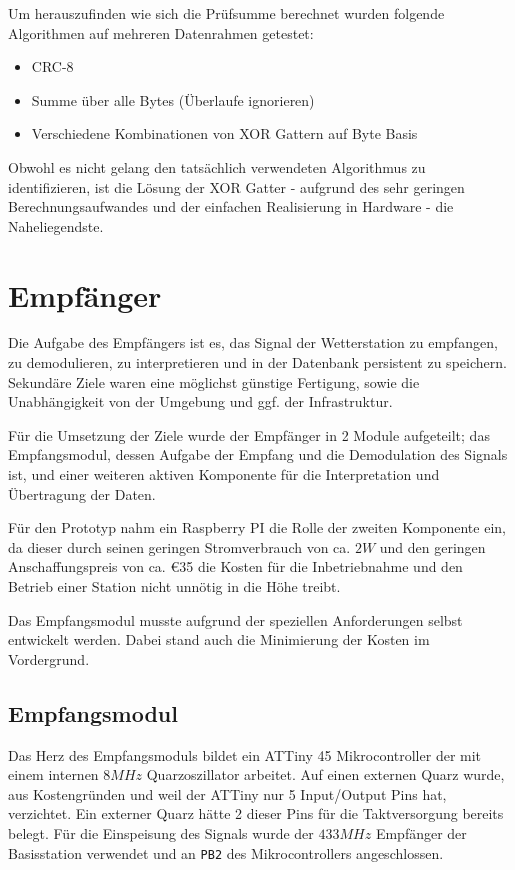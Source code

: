 \documentclass{report}
\begin{document}
Um herauszufinden wie sich die Prüfsumme berechnet wurden folgende Algorithmen auf mehreren Datenrahmen getestet:
\begin{itemize}
    \item CRC-8
    \item Summe über alle Bytes (Überlaufe ignorieren)
    \item Verschiedene Kombinationen von XOR Gattern auf Byte Basis
\end{itemize}
Obwohl es nicht gelang den tatsächlich verwendeten Algorithmus zu identifizieren, ist die Lösung der XOR Gatter - aufgrund des sehr geringen Berechnungsaufwandes und der einfachen Realisierung in Hardware - die Naheliegendste.

\section{Empfänger}
Die Aufgabe des Empfängers ist es, das Signal der Wetterstation zu empfangen, zu demodulieren, zu interpretieren und in der Datenbank persistent zu speichern. Sekundäre Ziele waren eine möglichst günstige Fertigung, sowie die Unabhängigkeit von der Umgebung und ggf. der Infrastruktur.

Für die Umsetzung der Ziele wurde der Empfänger in 2 Module aufgeteilt; das Empfangsmodul, dessen Aufgabe der Empfang und die Demodulation des Signals ist, und einer weiteren aktiven Komponente für die Interpretation und Übertragung der Daten. 

Für den Prototyp nahm ein Raspberry PI\cite{RasPi} die Rolle der zweiten Komponente ein, da dieser durch seinen geringen Stromverbrauch von ca. $2W$ und den geringen Anschaffungspreis von ca. \euro{35} die Kosten für die Inbetriebnahme und den Betrieb einer Station nicht unnötig in die Höhe treibt. 

Das Empfangsmodul musste aufgrund der speziellen Anforderungen selbst entwickelt werden. Dabei stand auch die Minimierung der Kosten im Vordergrund.

\subsection{Empfangsmodul}
Das Herz des Empfangsmoduls bildet ein ATTiny 45 Mikrocontroller\cite{ATtiny45} der mit einem internen $8MHz$ Quarzoszillator arbeitet. Auf einen externen Quarz wurde, aus Kostengründen und weil der ATTiny nur 5 Input/Output Pins hat, verzichtet. Ein externer Quarz hätte 2 dieser Pins für die Taktversorgung bereits belegt. Für die Einspeisung des Signals wurde der $433MHz$ Empfänger der Basisstation verwendet und an \verb+PB2+ des Mikrocontrollers angeschlossen. 
\end{document}
